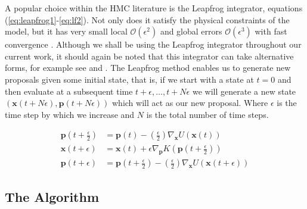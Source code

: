 \documentclass[twoside]{article}
\begin{document}
A popular choice within the HMC literature is the Leapfrog integrator, equations (\ref{eq:leapfrog1}-\ref{eq:lf2}). Not only does it satisfy the physical constraints of the model, but it has very small local  $\mathcal{O}(\epsilon^{2})$ and global errors $\mathcal{O}(\epsilon^{3})$ with fast convergence \citep{neal2011mcmc}. Although we shall be using the Leapfrog integrator throughout our current work, it should again be noted that this integrator can take alternative forms, for example see \citep{girolami2011riemann}\citep{nishimura2017discontinuous} and \citep{blanes2012explicit}. The Leapfrog method enables us to generate new proposals given some initial state, that is, if we start with a state at $t = 0$ and then evaluate at a subsequent time $t + \epsilon , \hdots, t + N\epsilon$ we will generate a new state $(\textbf{x}(t + N\epsilon),\textbf{p}(t + N\epsilon))$ which will act as our new proposal. Where $\epsilon$ is the time step by which we increase and $N$ is the total number of time steps.

\begin{align}
\label{eq:leapfrog1}
\textbf{p}(t + \frac{\epsilon}{2}) &= \textbf{p}(t) - \left(\frac{\epsilon}{2}\right) \nabla_\textbf{x}U(\textbf{x}(t)) \\
\textbf{x}(t + \epsilon) &= \textbf{x}(t) + \epsilon \nabla_{\textbf{p}}K(\textbf{p}(t + \frac{\epsilon}{2}))\\
\label{eq:lf2}
\textbf{p}(t + \epsilon) &= \textbf{p}(t + \frac{\epsilon}{2}) - \left(\frac{\epsilon}{2}\right)\nabla_{\textbf{x}} U(\textbf{x}(t+\epsilon))
\end{align}
\subsection{The Algorithm}
\end{document}
